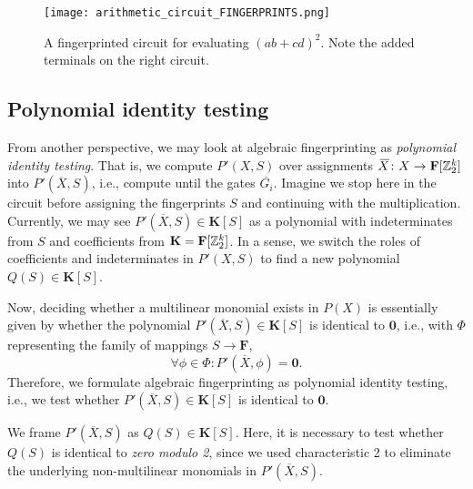 \begin{figure}[!h]
  \texttt{[image: arithmetic\_circuit\_FINGERPRINTS.png]}
  \centering
  \caption{A fingerprinted circuit for evaluating $(ab+cd)^2$. 
  Note the added terminals on the right circuit.}
  \label{fig:circuit_fingerprints}
\end{figure}

\FloatBarrier
\subsection{Polynomial identity testing}
\label{sect:polynomial_identity_testing}

From another perspective, we may look at algebraic fingerprinting as \emph{polynomial identity testing}. 
That is, we compute $P'(X, S)$ over assignments 
$\,\overline{\!{X}} \colon X \to \mathbf{F}[\mathbb Z_2^k]$ into $P'(\overbar{X}, S)$, i.e., 
compute until the gates $\overbar{G_i}$. 
Imagine we stop here in the circuit before assigning the fingerprints $S$ 
and continuing with the multiplication. 
Currently, we may see $P'(\overbar{X}, S) \in \mathbf{K}[S]$ as a polynomial 
with indeterminates from $S$ and coefficients from $\mathbf{K} = \mathbf{F}[\mathbb Z_2^k]$. 
In a sense, we switch the roles of coefficients and indeterminates in $P'(X, S)$ 
to find a new polynomial $Q(S) \in \mathbf{K}[S]$. 

Now, deciding whether a multilinear monomial exists in $P(X)$ is essentially given by 
whether the polynomial $P'(\overbar{X}, S) \in \mathbf{K}[S]$ is identical to $\mathbf{0}$, 
i.e., with $\Phi$ representing the family of mappings $S \to \mathbf{F}$, 
\[
  \forall \phi \in \Phi %
  \colon P'(\overbar{X}, \phi) = \mathbf{0}.
\]
Therefore, we formulate algebraic fingerprinting as polynomial identity testing, i.e., 
we test whether $P'(\overbar{X}, S) \in \mathbf{K}[S]$ is identical to $\mathbf{0}$.

\begin{problem}
\end{problem}

We frame $P'(\overbar{X}, S)$ as $Q(S) \in \mathbf{K}[S]$. 
Here, it is necessary to test whether $Q(S)$ is identical to \emph{zero modulo 2}, 
since we used characteristic 2 to eliminate 
the underlying non-multilinear monomials in $P'(\overbar{X}, S)$.

